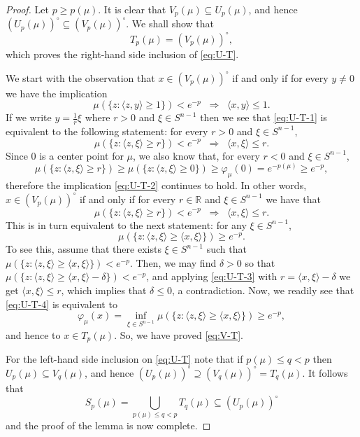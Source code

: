\documentclass[11pt,leqno]{article}
\theoremstyle{definition}
\theoremstyle{remark}
\numberwithin{equation}{section}
\newcommand{\ls}{\leqslant}
\newcommand{\gr}{\geqslant}
\newcommand{\1}{\textbf{1}}
\begin{document}
\begin{proof}Let $p\gr p(\mu)$. It is clear that $V_p(\mu)\subseteq U_p(\mu)$, and hence
$(U_p(\mu))^{\circ}\subseteq (V_p(\mu))^{\circ}$. We shall show that
\begin{equation}\label{eq:V-T}T_p(\mu)=(V_p(\mu))^{\circ},\end{equation}
which proves the right-hand side inclusion of \eqref{eq:U-T}.

We start with the observation that $x\in (V_p(\mu))^{\circ}$ if and only if for every $y\neq 0$ we have the implication
\begin{equation}\label{eq:U-T-1}\mu(\{z:\langle z,y\rangle\gr 1\})<e^{-p}\;\;\Longrightarrow\;\;\langle x,y\rangle\ls 1.\end{equation}
If we write $y=\frac{1}{r}\xi$ where $r>0$ and $\xi\in S^{n-1}$ then we see that \eqref{eq:U-T-1} is equivalent
to the following statement: for every $r>0$ and $\xi\in S^{n-1}$,
\begin{equation}\label{eq:U-T-2}\mu(\{z:\langle z,\xi\rangle\gr r\})<e^{-p}\;\;\Longrightarrow\;\;\langle x,\xi\rangle\ls r.\end{equation}
Since $0$ is a center point for $\mu$, we also know that, for every $r<0$ and $\xi\in S^{n-1}$,
$$\mu(\{z:\langle z,\xi\rangle\gr r\})\gr \mu(\{z:\langle z,\xi\rangle\gr 0\})\gr \varphi_{\mu}(0)
= e^{-p(\mu)}\gr e^{-p},$$
therefore the implication \eqref{eq:U-T-2} continues to hold. In other words, $x\in (V_p(\mu))^{\circ}$ if and only if
for every $r\in\mathbb{R}$ and $\xi\in S^{n-1}$ we have that
\begin{equation}\label{eq:U-T-3}\mu(\{z:\langle z,\xi\rangle\gr r\})<e^{-p}\;\;\Longrightarrow\;\;\langle x,\xi\rangle\ls r.\end{equation}
This is in turn equivalent to the next statement: for any $\xi\in S^{n-1}$,
\begin{equation}\label{eq:U-T-4}\mu(\{z:\langle z,\xi\rangle \gr \langle x,\xi\rangle \})\gr e^{-p}.\end{equation}
To see this, assume that there exists $\xi\in S^{n-1}$ such that $\mu(\{z:\langle z,\xi\rangle \gr \langle x,\xi\rangle \})< e^{-p}$.
Then, we may find $\delta>0$ so that $\mu(\{z:\langle z,\xi\rangle \gr \langle x,\xi\rangle -\delta \})<e^{-p}$,
and applying \eqref{eq:U-T-3} with $r=\langle x,\xi\rangle -\delta $ we get $\langle x,\xi\rangle \leq r$, which implies
that $\delta\ls 0$, a contradiction. Now, we readily see that \eqref{eq:U-T-4} is equivalent to
$$\varphi_{\mu}(x)=\inf_{\xi\in S^{n-1}}\mu(\{z:\langle z,\xi\rangle \gr \langle x,\xi\rangle \})\gr e^{-p},$$
and hence to $x\in T_p(\mu)$. So, we have proved \eqref{eq:V-T}.

For the left-hand side inclusion on \eqref{eq:U-T} note that if $p(\mu)\ls q<p$ then $U_p(\mu)\subseteq V_q(\mu)$,
and hence $(U_p(\mu))^{\circ}\supseteq (V_q(\mu))^{\circ}=T_q(\mu)$. It follows that
$$S_p(\mu)=\bigcup_{p(\mu)\ls q<p}T_q(\mu)\subseteq (U_p(\mu))^{\circ}$$
and the proof of the lemma is now complete.\end{proof}
\end{document}

